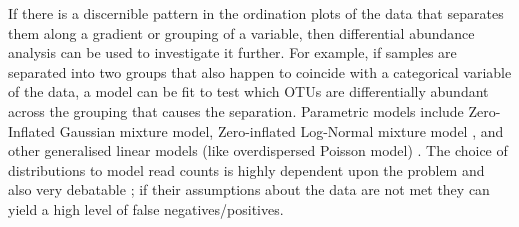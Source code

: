If there is a discernible pattern in the ordination plots of the data that separates them along a gradient or grouping of a variable, then differential  abundance analysis can be used to investigate it further. For example, if samples are separated into two groups that also happen to coincide with a categorical variable of the data, a model can be fit to test which OTUs are differentially abundant across the grouping that causes the separation. Parametric models include Zero-Inflated Gaussian mixture model,   Zero-inflated Log-Normal mixture model \cite{css_diff_abund}, and other generalised linear models (like overdispersed Poisson model) \cite{robinson_edger:_2010}. The choice of distributions to model read counts is highly dependent upon the problem and also very debatable \cite{css_diff_abund,white_statistical_2009,mcmurdie_waste_2014}; if their assumptions about the data are not met they can yield a high level of false negatives/positives. 

